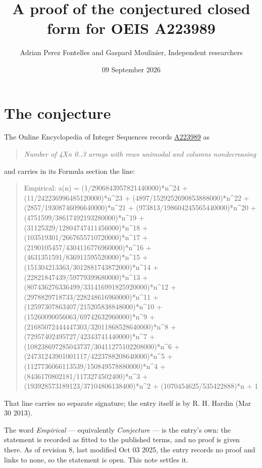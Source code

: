\documentclass[11pt]{article}
\title{A proof of the conjectured closed form for OEIS A223989}
\author{Adrian Perez Fontelles and Gaspard Moulinier, Independent researchers}
\date{09 September 2026}
\theoremstyle{definition}
\begin{document}
\maketitle
\section{The conjecture}

The Online Encyclopedia of Integer Sequences records \href{https://oeis.org/A223989}{A223989} as

\begin{quote}\itshape Number of 4Xn 0..3 arrays with rows unimodal and columns nondecreasing\end{quote}

and carries in its Formula section the line:

\begin{quote}\ttfamily Empirical: a(n) = (1/2906843957821440000)*n\textasciicircum{}24 + (11/242236996485120000)*n\textasciicircum{}23 + (4897/1529252690853888000)*n\textasciicircum{}22 + (2857/19308746096640000)*n\textasciicircum{}21 + (973813/198604245565440000)*n\textasciicircum{}20 + (4751599/38617492193280000)*n\textasciicircum{}19 + (31125329/12804747411456000)*n\textasciicircum{}18 + (103519301/2667655710720000)*n\textasciicircum{}17 + (2190105457/4304116776960000)*n\textasciicircum{}16 + (4631351591/836911595520000)*n\textasciicircum{}15 + (151304213363/3012881743872000)*n\textasciicircum{}14 + (22821847439/59779399680000)*n\textasciicircum{}13 + (807436276336499/331416991825920000)*n\textasciicircum{}12 + (2978829718733/228248616960000)*n\textasciicircum{}11 + (12597307863407/215205838848000)*n\textasciicircum{}10 + (15260090056063/69742632960000)*n\textasciicircum{}9 + (21685072444447303/32011868528640000)*n\textasciicircum{}8 + (72957402495727/42343741440000)*n\textasciicircum{}7 + (108238697285043737/30411275102208000)*n\textasciicircum{}6 + (24731243901001117/4223788208640000)*n\textasciicircum{}5 + (1127736066113539/150849578880000)*n\textasciicircum{}4 + (8436170802181/1173274502400)*n\textasciicircum{}3 + (193928573189123/37104806138400)*n\textasciicircum{}2 + (1070454625/535422888)*n + 1\end{quote}

That line carries no separate signature; the entry itself is by R. H. Hardin (Mar 30 2013).

The word {\itshape Empirical} --- equivalently {\itshape Conjecture} --- is the entry's own: the statement is recorded as fitted to the published terms, and no proof is given there. As of revision 8, last modified Oct 03 2025, the entry records no proof and links to none, so the statement is open. This note settles it.
\end{document}
